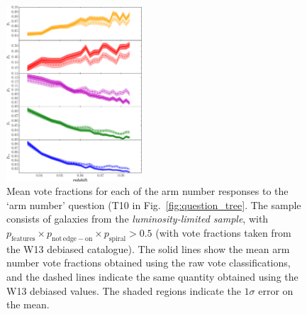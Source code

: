 \documentclass[useAMS,usenatbib]{mn2e}
\begin{document}
\begin{figure}
		\centering

        \includegraphics[width=0.45\textwidth]{Images/Bias/Biases/mean_arm_fractions.pdf}

        \caption{Mean vote fractions for each of the arm number responses to the `arm number' question (T10 in Fig.~\ref{fig:question_tree}. The sample consists of galaxies from the \textit{luminosity-limited sample}, with $p_\mathrm{features} \times p_\mathrm{not \, edge-on} \times p_\mathrm{spiral} > 0.5$ (with vote fractions taken from the W13 debiased catalogue). The solid lines show the mean arm number vote fractions obtained using the raw vote classifications, and the dashed lines indicate the same quantity obtained using the W13 debiased values. The shaded regions indicate the $1 \sigma$ error on the mean.}

        \label{fig:arm_bias}

\end{figure}
\end{document}
